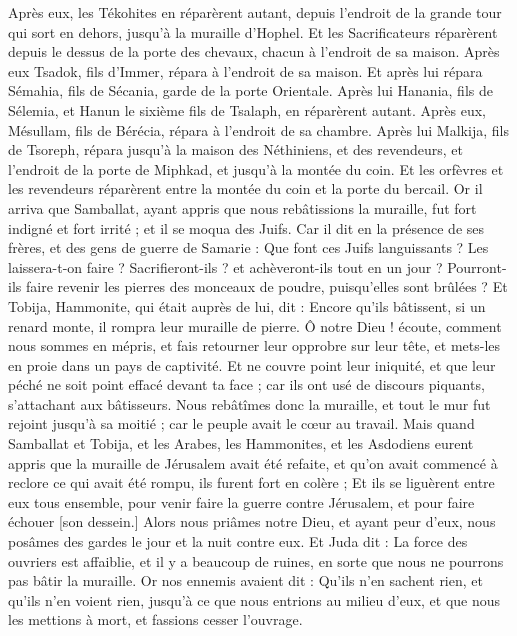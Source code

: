 \begin{multicols}{2}
{Après eux, les Tékohites en réparèrent autant, depuis l'endroit de la grande tour qui sort en dehors, jusqu'à la muraille d'Hophel.
Et les Sacrificateurs réparèrent depuis le dessus de la porte des chevaux, chacun à l'endroit de sa maison.
Après eux Tsadok, fils d'Immer, répara à l'endroit de sa maison. Et après lui répara Sémahia, fils de Sécania, garde de la porte Orientale.
Après lui Hanania, fils de Sélemia, et Hanun le sixième fils de Tsalaph, en réparèrent autant. Après eux, Mésullam, fils de Bérécia, répara à l'endroit de sa chambre.
Après lui Malkija, fils de Tsoreph, répara jusqu'à la maison des Néthiniens, et des revendeurs, et l'endroit de la porte de Miphkad, et jusqu'à la montée du coin.
Et les orfèvres et les revendeurs réparèrent entre la montée du coin et la porte du bercail.
\VerseOne{}Or il arriva que Samballat, ayant appris que nous rebâtissions la muraille, fut fort indigné et fort irrité ; et il se moqua des Juifs.
Car il dit en la présence de ses frères, et des gens de guerre de Samarie : Que font ces Juifs languissants ? Les laissera-t-on faire ? Sacrifieront-ils ? et achèveront-ils tout en un jour ? Pourront-ils faire revenir les pierres des monceaux de poudre, puisqu'elles sont brûlées ?
Et Tobija, Hammonite, qui était auprès de lui, dit : Encore qu'ils bâtissent, si un renard monte, il rompra leur muraille de pierre.
Ô notre Dieu ! écoute, comment nous sommes en mépris, et fais retourner leur opprobre sur leur tête, et mets-les en proie dans un pays de captivité.
Et ne couvre point leur iniquité, et que leur péché ne soit point effacé devant ta face ; car ils ont usé de discours piquants, s'attachant aux bâtisseurs.
Nous rebâtîmes donc la muraille, et tout le mur fut rejoint jusqu'à sa moitié ; car le peuple avait le cœur au travail.
Mais quand Samballat et Tobija, et les Arabes, les Hammonites, et les Asdodiens eurent appris que la muraille de Jérusalem avait été refaite, et qu'on avait commencé à reclore ce qui avait été rompu, ils furent fort en colère ;
Et ils se liguèrent entre eux tous ensemble, pour venir faire la guerre contre Jérusalem, et pour faire échouer [son dessein.]
Alors nous priâmes notre Dieu, et ayant peur d'eux, nous posâmes des gardes le jour et la nuit contre eux.
Et Juda dit : La force des ouvriers est affaiblie, et il y a beaucoup de ruines, en sorte que nous ne pourrons pas bâtir la muraille.
Or nos ennemis avaient dit : Qu'ils n'en sachent rien, et qu'ils n'en voient rien, jusqu'à ce que nous entrions au milieu d'eux, et que nous les mettions à mort, et fassions cesser l'ouvrage.
}
\end{multicols}
